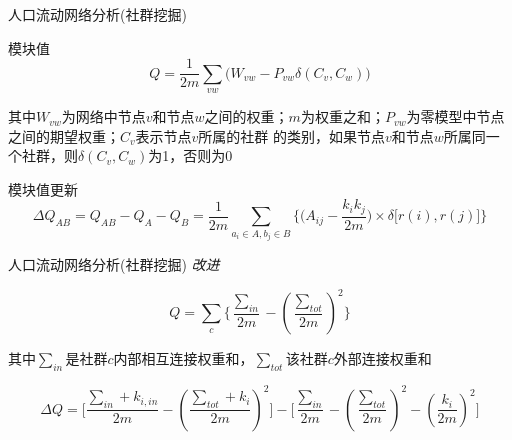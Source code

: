 \begin{frame}[t]{人口流动网络分析(社群挖掘)}
    \small

    \begin{alert}{模块值}
        \begin{equation}
            Q=\frac{1}{2m}\displaystyle{\sum_{vw}\big(W_{vw}-P_{vw}\delta(C_v,C_w)\big)}
        \end{equation}
    \end{alert}
    其中$W_{vw}$为网络中节点$v$和节点$w$之间的权重；$m$为权重之和；$P_{vw}$为零模型中节点之间的期望权重；$C_v$表示节点$v$所属的社群
的类别，如果节点$v$和节点$w$所属同一个社群，则$\delta(C_v,C_w)$为1，否则为0

    \begin{alert}{模块值更新}
        \begin{equation}
        \Delta Q_{AB}=Q_{AB}-Q_{A}-Q_{B}=\frac{1}{2m}\displaystyle{\sum_{a_i \in A, b_j \in B}}\bigg\{ \big( A_{ij} - \frac{k_ik_j}{2m} 
        \big) \times \delta \big[ r(i),r(j) \big] \bigg\}
        \end{equation}
    \end{alert}





\end{frame}

\begin{frame}[t]{人口流动网络分析(社群挖掘)}
    \emph{改进}

    \begin{equation}
        Q=\sum_{c}\big\{\frac{\sum_{in}}{2m} - (\frac{\sum_{tot}}{2m})^2\big\}
    \end{equation}

    其中$\sum_{in}$是社群$c$内部相互连接权重和，$\sum_{tot}$该社群$c$外部连接权重和

    \pause

    \begin{equation}
        \Delta Q=\big[ \frac{\sum_{in} + k_{i,in}}{2m} -(\frac{\sum_{tot}+k_i}{2m})^2 \big] 
            - \big[ \frac{\sum_{in}}{2m} - (\frac{\sum_{tot}}{2m})^2 - (\frac{k_i}{2m})^2 \big]
    \end{equation}

\end{frame}

